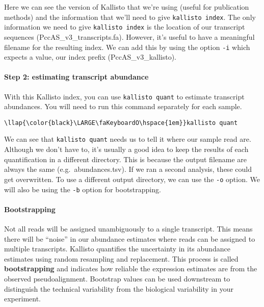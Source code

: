 \documentclass[11pt]{article}
\begin{document}
    Here we can see the version of Kallisto that we're using (useful for
publication methods) and the information that we'll need to give
\texttt{kallisto\ index}. The only information we need to give
\texttt{kallisto\ index} is the location of our transcript sequences
(PccAS\_v3\_transcripts.fa). However, it's useful to have a meaningful
filename for the resulting index. We can add this by using the option
\texttt{-i} which expects a value, our index prefix
(PccAS\_v3\_kallisto).

    \hypertarget{step-2-estimating-transcript-abundance}{%
\paragraph{Step 2: estimating transcript
abundance}\label{step-2-estimating-transcript-abundance}}

With this Kallisto index, you can use \texttt{kallisto\ quant} to
estimate transcript abundances. You will need to run this command
separately for each sample.





\begin{terminalinput}
\begin{Verbatim}[commandchars=\\\{\}]
\llap{\color{black}\LARGE\faKeyboardO\hspace{1em}}kallisto quant
\end{Verbatim}
\end{terminalinput}



    We can see that \texttt{kallisto\ quant} needs us to tell it where our
sample read are. Although we don't have to, it's usually a good idea to
keep the results of each quantification in a different directory. This
is because the output filename are always the same
(e.g.~abundances.tsv). If we ran a second analysis, these could get
overwritten. To use a different output directory, we can use the
\texttt{-o} option. We will also be using the \texttt{-b} option for
bootstrapping.

    \hypertarget{bootstrapping}{%
\paragraph{Bootstrapping}\label{bootstrapping}}

Not all reads will be assigned unambiguously to a single
transcript. This means there will be ``noise'' in our abundance
estimates where reads can be assigned to multiple transcripts. Kallisto quantifies the uncertainty in its
abundance estimates using random resampling and replacement. This
process is called \textbf{bootstrapping} and indicates how reliable the
expression estimates are from the observed pseudoalignment. Bootstrap values can be used downstream to distinguish the technical
variability from the biological variability in your experiment.
\end{document}
